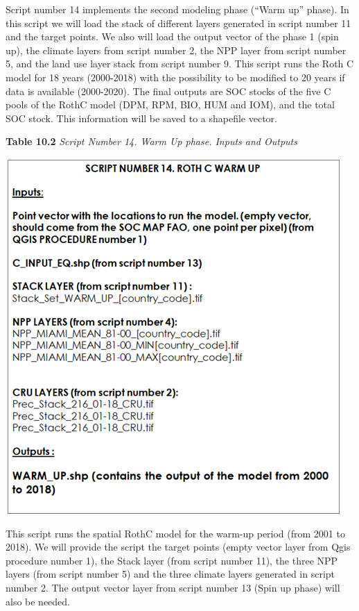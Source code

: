 \documentclass[
  10pt,
  b5paper,
]{book}
\begin{document}
Script number 14 implements the second modeling phase (``Warm up'' phase). In this script we will load the stack of different layers generated in script number 11 and the target points. We also will load the output vector of the phase 1 (spin up), the climate layers from script number 2, the NPP layer from script number 5, and the land use layer stack from script number 9. This script runs the Roth C model for 18 years (2000-2018) with the possibility to be modified to 20 years if data is available (2000-2020). The final outputs are SOC stocks of the five C pools of the RothC model (DPM, RPM, BIO, HUM and IOM), and the total SOC stock. This information will be saved to a shapefile vector.

\textbf{Table 10.2} \emph{Script Number 14. Warm Up phase. Inputs and Outputs}

\includegraphics{tables/Table_10.2.png}

This script runs the spatial RothC model for the warm-up period (from 2001 to 2018). We will provide the script the target points (empty vector layer from Qgis procedure number 1), the Stack layer (from script number 11), the three NPP layers (from script number 5) and the three climate layers generated in script number 2. The output vector layer from script number 13 (Spin up phase) will also be needed.
\end{document}
